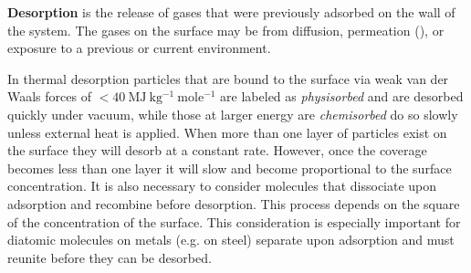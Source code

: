 \begin{table}
\centering
{}
\caption{Outgassing rates of \htwoo, , , and  from 316L stainless steel after various treatments.  Significant
reductions from bakeouts can be seen.  Before treatment each samble was subjected to a two-hour degreasing with perchlorethylene vapor at
$125^{\circ}\mathrm{C}$, followed by a one-hour ultrasonic washing at $55^{\circ}\mathrm{C}$, and finally were rinsed with clean water and
dried.  Data is taken from .}
\label{tab:electron_lifetime_model_outgassing_treatment_rates}
\end{table}

\textbf{Desorption} is the release of gases that were previously adsorbed on the wall of the system.  The gases on the surface may be from
diffusion, permeation (), or exposure to a previous or current
environment.

In thermal desorption particles that are bound to the surface via weak van der Waals forces of
$< 40\ \mathrm{MJ\ kg^{-1}\ mole^{-1}}$ are labeled
as \textit{physisorbed} and are desorbed quickly under vacuum, while those at larger energy are \textit{chemisorbed} do so slowly unless
external heat is applied.  When more than one layer of particles exist on the surface they will desorb at a constant rate.  However, once
the coverage becomes less than one layer it will slow and become proportional to the surface concentration.  It is also necessary to
consider molecules that dissociate upon adsorption and recombine before desorption.  This process depends on the square of the
concentration
of the surface.  This consideration is especially important for diatomic molecules on metals (e.g.  on steel) separate upon
adsorption and must reunite before they can be desorbed.

